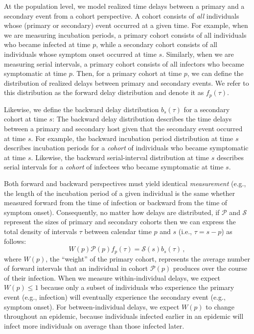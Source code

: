 \documentclass[12pt]{article}
\newcommand{\psymp}{\ensuremath{p}} %
\newcommand{\ssymp}{\ensuremath{s}} %
\newcommand{\psize}{{\mathcal P}} %
\newcommand{\ssize}{{\mathcal S}} %
\begin{document}
At the population level, we model realized time delays between a primary and a secondary event from a cohort perspective.
A cohort consists of \emph{all} individuals whose (primary or secondary) event occurred at a given time. 
For example, when we are measuring incubation periods, a primary cohort consists of all individuals who became infected at time \psymp, while a secondary cohort consists of all individuals whose symptom onset occurred at time $\ssymp$.
Similarly, when we are measuring serial intervals, a primary cohort consists of all infectors who became symptomatic at time $\psymp$.
Then, for a primary cohort at time $\psymp$, we can define the distribution of realized delays between primary and secondary events. 
We refer to this distribution as the forward delay distribution and denote it as $f_\psymp(\tau)$.

Likewise, we define the backward delay distribution $b_\ssymp(\tau)$ for a secondary cohort at time $\ssymp$:
The backward delay distribution describes the time delays between a primary and secondary host given that the secondary event occurred at time $\ssymp$.
For example, the backward incubation period distribution at time $\ssymp$ describes incubation periods for a \emph{cohort} of individuals who became symptomatic at time $\ssymp$.
Likewise, the backward serial-interval distribution at time $\ssymp$ describes serial intervals for a \emph{cohort} of infectees who became symptomatic at time $\ssymp$.

Both forward and backward perspectives
must yield identical \emph{measurement} (e.g., the length of the incubation
period of a given individual is the same whether measured forward from
the time of infection or backward from the time of symptom onset).
Consequently, no matter how delays are distributed, if
$\mathcal P$ and $\mathcal S$ represent the sizes of primary and
secondary cohorts then we can express the total density of intervals $\tau$ between calendar time $\psymp$ and $\ssymp$ (i.e., $\tau=\ssymp-\psymp$) as follows:
\begin{equation}
W(\psymp) \psize(\psymp) f_\psymp(\tau) = \ssize(\ssymp) b_\ssymp(\tau) \,,
\label{eq:match}
\end{equation}
where $W(\psymp)$, the ``weight'' of the primary cohort, represents the average number of forward intervals that an individual in cohort $\psize(\psymp)$ produces over the course of their infection.
When we measure within-individual delays, we expect $W(\psymp) \leq 1$ because only a subset of individuals who experience the primary event (e.g., infection) will eventually experience the secondary event (e.g., symptom onset).
For between-individual delays, we expect $W(\psymp)$ to change throughout an epidemic, because individuals infected earlier in an epidemic will infect more individuals on average than those infected later.
\end{document}

